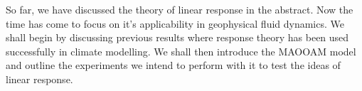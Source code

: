 So far, we have discussed the theory of linear response in the abstract. Now the time has come to focus on it's applicability in geophysical fluid dynamics. We shall begin by discussing previous results where response theory has been used successfully in climate modelling. We shall then introduce the MAOOAM model and outline the experiments we intend to perform with it to test the ideas of linear response.